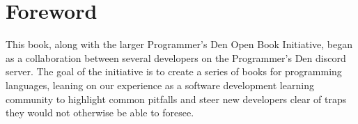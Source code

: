 \documentclass[../main.tex]{subfiles}
\begin{document}
\chapter*{Foreword}
This book, along with the larger Programmer's Den Open Book Initiative,
began as a collaboration between several developers on the Programmer's Den
discord server. The goal of the initiative is to create a series of books for
programming languages, leaning on our experience as a software development
learning community to highlight common pitfalls and steer new developers
clear of traps they would not otherwise be able to foresee.

\end{document}
